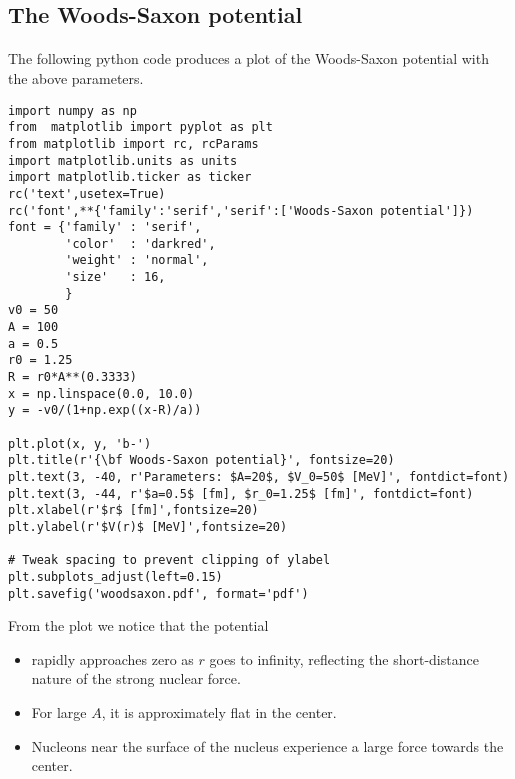 \documentclass[%
twoside,                 %
final,                   %
10pt]{article}
\begin{document}
\subsection*{The Woods-Saxon potential}

\paragraph{}
The following python code produces a plot of the Woods-Saxon potential with the above parameters. 

\begin{verbatim}
import numpy as np
from  matplotlib import pyplot as plt
from matplotlib import rc, rcParams
import matplotlib.units as units
import matplotlib.ticker as ticker
rc('text',usetex=True)
rc('font',**{'family':'serif','serif':['Woods-Saxon potential']})
font = {'family' : 'serif',
        'color'  : 'darkred',
        'weight' : 'normal',
        'size'   : 16,
        }
v0 = 50
A = 100
a = 0.5
r0 = 1.25
R = r0*A**(0.3333)
x = np.linspace(0.0, 10.0)
y = -v0/(1+np.exp((x-R)/a))

plt.plot(x, y, 'b-')
plt.title(r'{\bf Woods-Saxon potential}', fontsize=20)     
plt.text(3, -40, r'Parameters: $A=20$, $V_0=50$ [MeV]', fontdict=font)
plt.text(3, -44, r'$a=0.5$ [fm], $r_0=1.25$ [fm]', fontdict=font)
plt.xlabel(r'$r$ [fm]',fontsize=20)
plt.ylabel(r'$V(r)$ [MeV]',fontsize=20)

# Tweak spacing to prevent clipping of ylabel
plt.subplots_adjust(left=0.15)
plt.savefig('woodsaxon.pdf', format='pdf')
\end{verbatim}
From the plot we notice that the potential
\begin{itemize}
\item rapidly approaches zero as $r$ goes to infinity, reflecting the short-distance nature of the strong nuclear force.

\item For large $A$, it is approximately flat in the center.

\item Nucleons near the surface of the nucleus experience a large force towards the center.
\end{itemize}

\noindent
\end{document}
